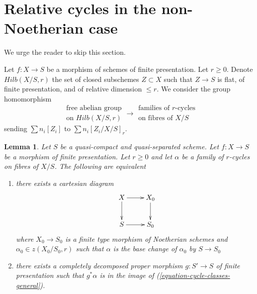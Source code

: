 \documentclass{stacks-project}
\theoremstyle{plain}
\newtheorem{lemma}[subsection]{Lemma}
\theoremstyle{definition}
\theoremstyle{remark}
\numberwithin{equation}{subsection}
\begin{document}
\section{Relative cycles in the non-Noetherian case}
\label{section-non-noetherian}

\noindent
We urge the reader to skip this section.

\medskip\noindent
Let $f : X \to S$ be a morphism of schemes of finite presentation.
Let $r \geq 0$. Denote $Hilb(X/S, r)$ the set of closed subschemes
$Z \subset X$ such that $Z \to S$ is flat, of finite presentation,
and of relative dimension $\leq r$. We consider the group homomorphism
\begin{equation}
\label{equation-cycle-classes-general}
\begin{matrix}
\text{free abelian group} \\
\text{on }Hilb(X/S, r)
\end{matrix}
\longrightarrow
\begin{matrix}
\text{families of }r\text{-cycles}\\
\text{on fibres of }X/S
\end{matrix}
\end{equation}
sending $\sum n_i[Z_i]$ to $\sum n_i[Z_i/X/S]_r$.

\begin{lemma}
\label{lemma-relative-r-cycle-general}
Let $S$ be a quasi-compact and quasi-separated scheme.
Let $f : X \to S$ be a morphism of finite presentation.
Let $r \geq 0$ and let $\alpha$ be a family of $r$-cycles on fibres of $X/S$.
The following are equivalent
\begin{enumerate}
\item there exists a cartesian diagram
$$
\xymatrix{
X \ar[r] \ar[d] & X_0 \ar[d] \\
S \ar[r] & S_0
}
$$
where $X_0 \to S_0$ is a finite type morphism of Noetherian schemes
and $\alpha_0 \in z(X_0/S_0, r)$ such that $\alpha$ is the base change
of $\alpha_0$ by $S \to S_0$
\item there exists a completely decomposed proper morphism $g : S' \to S$
of finite presentation such that $g^*\alpha$ is in the image of
(\ref{equation-cycle-classes-general}).
\end{enumerate}
\end{lemma}
\end{document}
